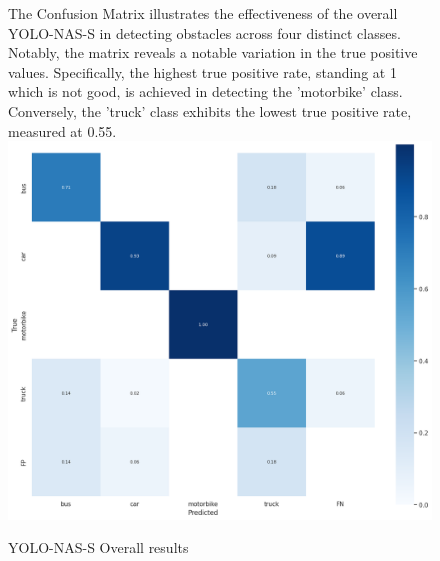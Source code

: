 \begin{figure}[H]
The Confusion Matrix illustrates the effectiveness of the overall YOLO-NAS-S in detecting obstacles across four distinct classes. Notably, the matrix reveals a notable variation in the true positive values. Specifically, the highest true positive rate, standing at 1 which is not good, is achieved in detecting the 'motorbike' class. Conversely, the 'truck' class exhibits the lowest true positive rate, measured at 0.55.
    \centering
    \includegraphics[width=\linewidth]{tex/img/YNS2_CM.png}
    \caption{YOLO-NAS-S Overall results }
    \label{fig:ConfusionMatrixY-N-S}
\end{figure}
\newpage

